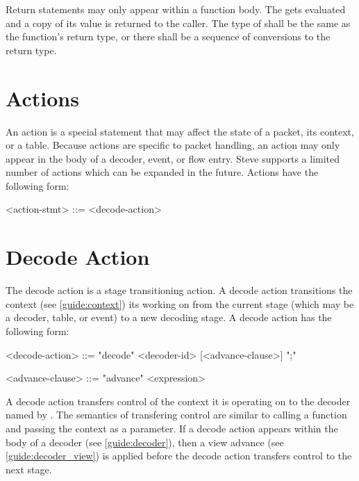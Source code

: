 Return statements may only appear within a function body. The  gets evaluated and a copy of its value is returned to the caller. The type of  shall be the same as the function's return type, or there shall be a sequence of conversions to the return type.

\section{Actions} \label{guide:action}

An action is a special statement that may affect the state of a packet, its context, or a table. Because actions are specific to packet handling, an action may only appear in the body of a decoder, event, or flow entry. Steve supports a limited number of actions which can be expanded in the future. Actions have the following form:

\begin{minip}
\begin{grammar}
<action-stmt> ::=
<decode-action>
\end{grammar}
\end{minip}


\section{Decode Action} \label{guide:decode_action}

The decode action is a stage transitioning action. A decode action transitions the context (see \ref{guide:context}) its working on from the current stage (which may be a decoder, table, or event) to a new decoding stage. A decode action has the following form:

\begin{minip}
\begin{grammar}
<decode-action> ::=
"decode" <decoder-id> [<advance-clause>] ";"

<advance-clause> ::= "advance" <expression>
\end{grammar}
\end{minip}

A decode action transfers control of the context it is operating on to the decoder named by . The semantics of transfering control are similar to calling a function and passing the context as a parameter. If a decode action appears within the body of a decoder (see \ref{guide:decoder}), then a view advance (see \ref{guide:decoder_view}) is applied before the decode action transfers control to the next stage.

